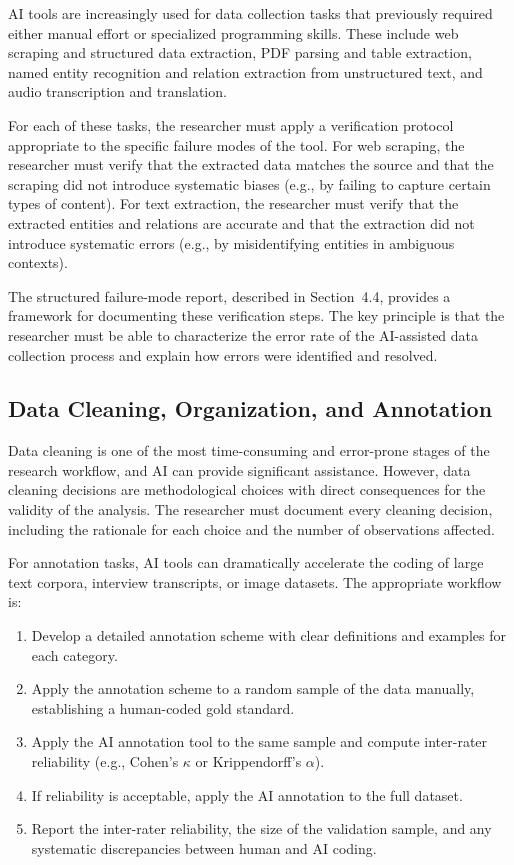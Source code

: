\documentclass[12pt, a4paper]{article}
\begin{document}
AI tools are increasingly used for data collection tasks that previously required either manual effort or specialized programming skills. These include web scraping and structured data extraction, PDF parsing and table extraction, named entity recognition and relation extraction from unstructured text, and audio transcription and translation.

For each of these tasks, the researcher must apply a verification protocol appropriate to the specific failure modes of the tool. For web scraping, the researcher must verify that the extracted data matches the source and that the scraping did not introduce systematic biases (e.g., by failing to capture certain types of content). For text extraction, the researcher must verify that the extracted entities and relations are accurate and that the extraction did not introduce systematic errors (e.g., by misidentifying entities in ambiguous contexts).

The structured failure-mode report, described in Section~4.4, provides a framework for documenting these verification steps. The key principle is that the researcher must be able to characterize the error rate of the AI-assisted data collection process and explain how errors were identified and resolved.

\subsection{Data Cleaning, Organization, and Annotation}

Data cleaning is one of the most time-consuming and error-prone stages of the research workflow, and AI can provide significant assistance. However, data cleaning decisions are methodological choices with direct consequences for the validity of the analysis. The researcher must document every cleaning decision, including the rationale for each choice and the number of observations affected.

For annotation tasks, AI tools can dramatically accelerate the coding of large text corpora, interview transcripts, or image datasets. The appropriate workflow is:

\begin{enumerate}
    \item Develop a detailed annotation scheme with clear definitions and examples for each category.
    \item Apply the annotation scheme to a random sample of the data manually, establishing a human-coded gold standard.
    \item Apply the AI annotation tool to the same sample and compute inter-rater reliability (e.g., Cohen's $\kappa$ or Krippendorff's $\alpha$).
    \item If reliability is acceptable, apply the AI annotation to the full dataset.
    \item Report the inter-rater reliability, the size of the validation sample, and any systematic discrepancies between human and AI coding.
\end{enumerate}
\end{document}
